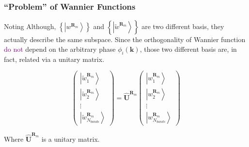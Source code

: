 \documentclass{beamer}
\begin{document}
  \begin{frame}
    \frametitle{``Problem'' of Wannier Functions}
  
    \begin{block}{Noting}
      Although, \(\left\{\left|w^{\mathbf{R}_m}\right\rangle\right\}\) and \(\left\{\left|\tilde{w}^{\mathbf{R}_m}\right\rangle\right\}\) are two different basis, they actually describe the same subspace. Since the orthogonality of Wannier function \textcolor{purple}{do not} depend on the arbitrary phase \(\phi_i(\mathbf{k})\), those two different basis are, in fact, related via a unitary matrix.
    \end{block}

    \begin{equation}
      \left( \begin{array}{c}
        \left|\tilde{w}^{\mathbf{R}_m}_1\right\rangle \\[5pt]
        \left|\tilde{w}^{\mathbf{R}_m}_2\right\rangle \\
        \vdots\\
        \left|\tilde{w}^{\mathbf{R}_m}_{N_{bands}}\right\rangle
        \end{array} \right) = \mathbf{\widehat{U}}^{\mathbf{R}_m}
      \left( \begin{array}{ccc}
        \left|w^{\mathbf{R}_m}_1\right\rangle \\[5pt]
        \left|w^{\mathbf{R}_m}_2\right\rangle \\
        \vdots\\
        \left|w^{\mathbf{R}_m}_{N_{bands}}\right\rangle
        \end{array} \right)
    \end{equation}
   
    Where \(\mathbf{\widehat{U}}^{\mathbf{R}_m}\) is a unitary matrix.
  
  \end{frame}
\end{document}
